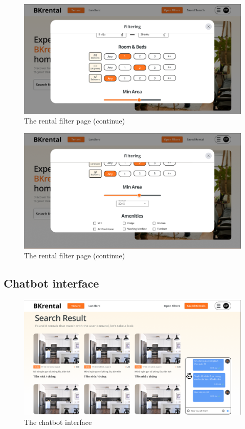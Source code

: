 \begin{figure}[ht]
    \centering
    \includegraphics[width=\textwidth]{Images/Mockup/rental_filter_2.png}
    \caption{The rental filter page (continue)}
    \label{fig:rental-filter-2} 
\end{figure}

\begin{figure}[ht]
    \centering
    \includegraphics[width=\textwidth]{Images/Mockup/rental_filter_3.png}
    \caption{The rental filter page (continue)}
    \label{fig:rental-filter-3} 
\end{figure}

\clearpage

\subsection{Chatbot interface}

\begin{figure}[ht]
    \centering
    \includegraphics[width=\textwidth]{Images/Mockup/chatbot.png}
    \caption{The chatbot interface}
    \label{fig:chatbot}
\end{figure}

